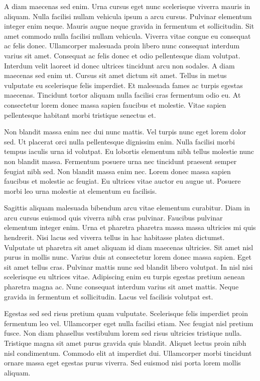 \documentclass[11pt,a4paper]{article}
\begin{document}
A diam maecenas sed enim. Urna cursus eget nunc scelerisque viverra mauris in aliquam. Nulla facilisi nullam vehicula ipsum a arcu cursus. Pulvinar elementum integer enim neque. Mauris augue neque gravida in fermentum et sollicitudin. Sit amet commodo nulla facilisi nullam vehicula. Viverra vitae congue eu consequat ac felis donec. Ullamcorper malesuada proin libero nunc consequat interdum varius sit amet. Consequat ac felis donec et odio pellentesque diam volutpat. Interdum velit laoreet id donec ultrices tincidunt arcu non sodales. A diam maecenas sed enim ut. Cursus sit amet dictum sit amet. Tellus in metus vulputate eu scelerisque felis imperdiet. Et malesuada fames ac turpis egestas maecenas. Tincidunt tortor aliquam nulla facilisi cras fermentum odio eu. At consectetur lorem donec massa sapien faucibus et molestie. Vitae sapien pellentesque habitant morbi tristique senectus et.

Non blandit massa enim nec dui nunc mattis. Vel turpis nunc eget lorem dolor sed. Ut placerat orci nulla pellentesque dignissim enim. Nulla facilisi morbi tempus iaculis urna id volutpat. Eu lobortis elementum nibh tellus molestie nunc non blandit massa. Fermentum posuere urna nec tincidunt praesent semper feugiat nibh sed. Non blandit massa enim nec. Lorem donec massa sapien faucibus et molestie ac feugiat. Eu ultrices vitae auctor eu augue ut. Posuere morbi leo urna molestie at elementum eu facilisis.

Sagittis aliquam malesuada bibendum arcu vitae elementum curabitur. Diam in arcu cursus euismod quis viverra nibh cras pulvinar. Faucibus pulvinar elementum integer enim. Urna et pharetra pharetra massa massa ultricies mi quis hendrerit. Nisi lacus sed viverra tellus in hac habitasse platea dictumst. Vulputate ut pharetra sit amet aliquam id diam maecenas ultricies. Sit amet nisl purus in mollis nunc. Varius duis at consectetur lorem donec massa sapien. Eget sit amet tellus cras. Pulvinar mattis nunc sed blandit libero volutpat. In nisl nisi scelerisque eu ultrices vitae. Adipiscing enim eu turpis egestas pretium aenean pharetra magna ac. Nunc consequat interdum varius sit amet mattis. Neque gravida in fermentum et sollicitudin. Lacus vel facilisis volutpat est.

Egestas sed sed risus pretium quam vulputate. Scelerisque felis imperdiet proin fermentum leo vel. Ullamcorper eget nulla facilisi etiam. Nec feugiat nisl pretium fusce. Non diam phasellus vestibulum lorem sed risus ultricies tristique nulla. Tristique magna sit amet purus gravida quis blandit. Aliquet lectus proin nibh nisl condimentum. Commodo elit at imperdiet dui. Ullamcorper morbi tincidunt ornare massa eget egestas purus viverra. Sed euismod nisi porta lorem mollis aliquam.
\end{document}
